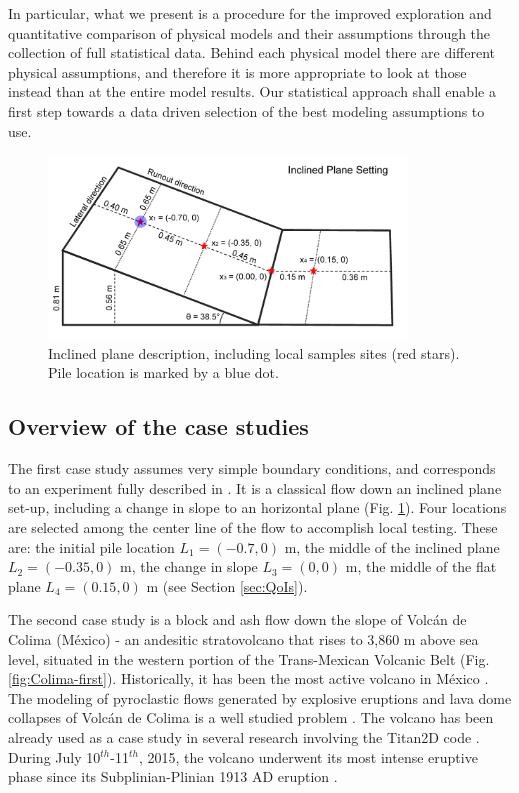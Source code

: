 \documentclass{article}
\begin{document}
In particular, what we present is a procedure for the improved exploration and quantitative comparison of physical models and their assumptions through the collection of full statistical data. Behind each physical model there are different physical assumptions, and therefore it is more appropriate to look at those instead than at the entire model results. Our statistical approach shall enable a first step towards a data driven selection of the best modeling assumptions to use.

\begin{figure}[H]
    \includegraphics[width=0.85\textwidth]{InclinedPlane/inclPlaneFig.jpg}
    \centering
    \caption{Inclined plane description, including local samples sites (red stars). Pile location is marked by a blue dot.}
    \label{fig:Ramp-first}
\end{figure}

\subsection{Overview of the case studies}
The first case study assumes very simple boundary conditions, and corresponds to an experiment fully described in \cite{Webb2004, Bursik2005, WebbBursik2016}. It is a classical flow down an inclined plane set-up, including a change in slope to an horizontal plane (Fig. \ref{fig:Ramp-first}). Four locations are selected among the center line of the flow to accomplish local testing. These are: the initial pile location $L_1=(-0.7,0)$ m, the middle of the inclined plane $L_2=(-0.35,0)$ m, the change in slope $L_3=(0,0)$ m, the middle of the flat plane $L_4=(0.15,0)$ m (see Section \ref{sec:QoIs}).

The second case study is a block and ash flow down the slope of Volc{\'a}n de Colima (M{\'e}xico) - an andesitic stratovolcano that rises to 3,860 m above sea level, situated in the western portion of the Trans-Mexican Volcanic Belt (Fig. \ref{fig:Colima-first}). Historically, it has been the most active volcano in M{\'e}xico \citep{DeLaCruzReina1993, Zobin2002, Gonzalez2002}. The modeling of pyroclastic flows generated by explosive eruptions and lava dome collapses of Volc{\'a}n de Colima is a well studied problem \citep{DelPozzo1995,Sheridan1995,Saucedo2002,Saucedo2004,Saucedo2005, Sarocchi2011, Capra2015}. The volcano has been already used as a case study in several research involving the Titan2D code \citep{Rupp2004, Rupp2006, Dalbey2008, Yu2009, Sulpizio2010, Capra2011, Aghakhani2016}. During July 10$^{th}$-11$^{th}$, 2015, the volcano underwent its most intense eruptive phase since its Subplinian-Plinian 1913 AD eruption \citep{Saucedo2010, Zobin2015, ReyesDaVilla2016, Capra2016}.
\end{document}
